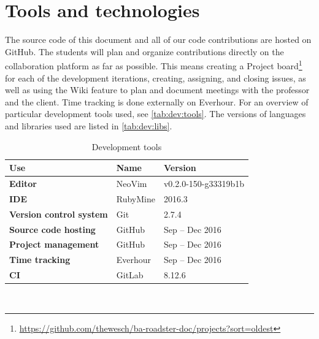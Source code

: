 \documentclass[a4paper]{report}
\begin{document}
\section{Tools and technologies}
The source code of this document and all of our code contributions are hosted
on GitHub. The students will plan and organize contributions directly on the
collaboration platform as far as possible. This means creating a Project board\footnote{\url{https://github.com/thewesch/ba-roadster-doc/projects?sort=oldest}} for each of the
development iterations, creating, assigning, and closing issues, as well as using
the Wiki feature to plan and document meetings with the professor and the
client. Time tracking is done externally on Everhour. For an overview of
particular development tools used, see \autoref{tab:dev:tools}.
The versions of languages and libraries used are listed in \autoref{tab:dev:libs}.


\begin{table}[]
  \centering
  \begin{tabular}{|p{50mm}|p{35mm}|p{35mm}|}
    \hline
    \bf Use & \bf Name & \bf Version \\ \hline
    \bf Editor & NeoVim & v0.2.0-150-g33319b1b \\ \hline
    \bf IDE & RubyMine & 2016.3 \\ \hline
    \bf Version control system & Git & 2.7.4 \\ \hline
    \bf Source code hosting & GitHub & Sep -- Dec 2016 \\ \hline
    \bf Project management & GitHub & Sep -- Dec 2016 \\ \hline
    \bf Time tracking & Everhour & Sep -- Dec 2016 \\ \hline
    \bf CI & GitLab & 8.12.6 \\ \hline
  \end{tabular} \\
  \caption{Development tools}
  \label{tab:dev:tools}
\end{table}
\end{document}
